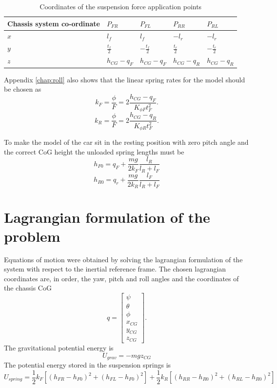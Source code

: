 \begin{table}[ht]
  \caption{Coordinates of the suspension force application points} %
  \centering %
  \begin{tabular}{l l l l l} %
    \hline\hline %
    Chassis system co-ordinate & $P_{FR}$ & $P_{FL}$ & $P_{RR}$ & $P_{RL}$ \\ [0.5ex] %
    \hline %
    $ x$ & $ l_f$ & $ l_f$ & $-l_r $ & $-l_r $\\ %
    $ y$ & $ \frac{t_f}{2} $ & $ -\frac{t_f}{2}$ & $ \frac{t_r}{2}$ & $ -\frac{t_r}{2}$\\ %
    $ z$ & $ h_{CG} - q_F $& $ h_{CG} - q_F $ & $ h_{CG} - q_R$ & $ h_{CG} - q_R$ \\ [1ex] %
    \hline %
  \end{tabular}
  \label{table:susppoints} %
\end{table}

Appendix \ref{chap:roll} also shows that the linear spring rates for the model should be chosen as
$$
k_F = \frac{\phi}{F} = 2\frac{h_{CG}-q_F}{K_{\phi F} t_F^2}.
$$
$$
k_R = \frac{\phi}{F} = 2\frac{h_{CG}-q_R}{K_{\phi R} t_F^2}.
$$

To make the model of the car sit in the resting position with zero pitch angle and the correct CoG height the unloaded spring lengths must be
$$ h_{F0} = q_F + \frac{mg}{2k_F}\frac{l_R}{l_R+l_F} $$
$$ h_{R0} = q_r + \frac{mg}{2k_R}\frac{l_F}{l_R+l_F} $$

\section{Lagrangian formulation of the problem}
\label{sec:6doflag}
Equations of motion were obtained by solving the lagrangian formulation of the system with respect to the inertial reference frame.
The chosen lagrangian coordinates are, in order, the yaw, pitch and roll angles and the coordinates of the chassis CoG
$$
q = \begin{bmatrix}
\psi \\
\theta \\
\phi \\
x_{CG} \\
y_{CG} \\
z_{CG}
\end{bmatrix}.
$$
The gravitational potential energy is
$$U_{grav} = -mgz_{CG}$$
The potential energy stored in the suspension springs is
$$ U_{spring} = \frac{1}{2} k_F [(h_{FR} - h_{F0})^2 + (h_{FL} - h_{F0})^2] +  \frac{1}{2} k_R [(h_{RR} - h_{R0})^2 + (h_{RL} - h_{R0})^2] $$

